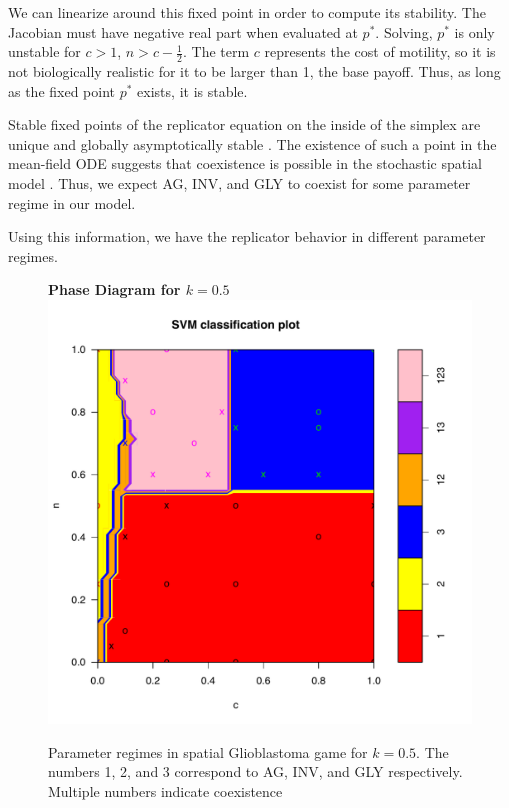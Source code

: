 \documentclass[12pt]{report}
\begin{document}
We can linearize around this fixed point in order to compute its stability. The Jacobian must have negative real part when evaluated at $p^*$. Solving, $p^*$ is only unstable for $c > 1$, $n > c - \frac{1}{2}$. The term $c$ represents the cost of motility, so it is not biologically realistic for it to be larger than 1, the base payoff. Thus, as long as the fixed point $p^*$ exists, it is stable.

Stable fixed points of the replicator equation on the inside of the simplex are unique and globally asymptotically stable \cite{Hofbauer1998}. The existence of such a point in the mean-field ODE suggests that coexistence is possible in the stochastic spatial model \cite{Durrett2009}. Thus, we expect AG, INV, and GLY to coexist for some parameter regime in our model. 

Using this information, we have the replicator behavior in different parameter regimes. 


\begin{figure}[H]
\centering
\textbf{Phase Diagram for $k = 0.5$}
\includegraphics[width = 0.9 \linewidth]{Diagrams/basanta_phase-cropped}
\caption{Parameter regimes in spatial Glioblastoma game for $k = 0.5$. The numbers 1, 2, and 3 correspond to AG, INV, and GLY respectively. Multiple numbers indicate coexistence}
\end{figure}
\end{document}
